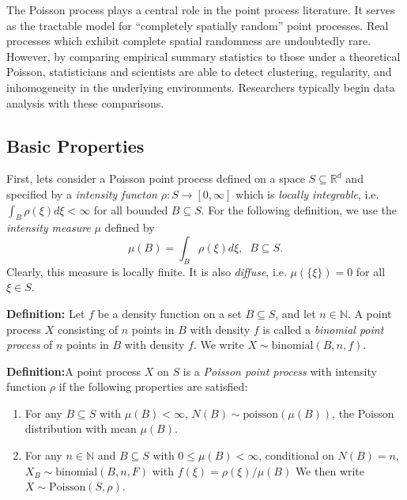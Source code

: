 \documentclass[12pt,twoside]{reedthesis}
\begin{document}
  The Poisson process plays a central role in the point process
  literature. It serves as the tractable model for ``completely spatially
  random'' point processes. Real processes which exhibit complete spatial
  randomness are undoubtedly rare. However, by comparing empirical summary
  statistics to those under a theoretical Poisson, statisticians and
  scientists are able to detect clustering, regularity, and inhomogeneity
  in the underlying environments. Researchers typically begin data
  analysis with these comparisons.
  
  \subsection{Basic Properties}\label{basic-properties}
  
  First, lets consider a Poisson point process defined on a space
  \(S\subseteq \mathbb{R}^d\) and specified by a \emph{intensity functon}
  \(\rho : S \rightarrow [0, \infty]\) which is \emph{locally integrable},
  i.e. \(\int_B \rho(\xi) d\xi < \infty\) for all bounded
  \(B\subseteq S\). For the following definition, we use the
  \emph{intensity measure} \(\mu\) defined by
  \[\mu(B) = \int_B \rho(\xi) d\xi, \; \; B\subseteq S.\] Clearly, this
  measure is locally finite. It is also \emph{diffuse}, i.e.
  \(\mu (\{ \xi \}) = 0\) for all \(\xi \in S\).
  
  \textbf{Definition:} Let \(f\) be a density function on a set
  \(B\subseteq S\), and let \(n\in \mathbb{N}\). A point process \(X\)
  consisting of \(n\) points in \(B\) with density \(f\) is called a
  \emph{binomial point process} of \(n\) points in \(B\) with density
  \(f\). We write \(X\sim \text{binomial}(B, n, f)\).
  
  \textbf{Definition:}A point process \(X\) on \(S\) is a \emph{Poisson
  point process} with intensity function \(\rho\) if the following
  properties are satisfied:
  
  \begin{enumerate}
  \def\labelenumi{\arabic{enumi}.}
  \itemsep1pt\parskip0pt
  \item
    For any \(B\subseteq S\) with \(\mu(B) < \infty\),
    \(N(B) \sim \text{poisson}(\mu(B))\), the Poisson distribution with
    mean \(\mu(B)\).
  \item
    For any \(n\in \mathbb{N}\) and \(B\subseteq S\) with
    \(0\leq \mu(B) < \infty\), conditional on \(N(B) = n\),
    \(X_B \sim \text{binomial}(B, n, F)\) with
    \(f(\xi) = \rho(\xi) / \mu(B)\) We then write
    \(X \sim \text{Poisson}(S, \rho)\).
  \end{enumerate}
  
\end{document}

